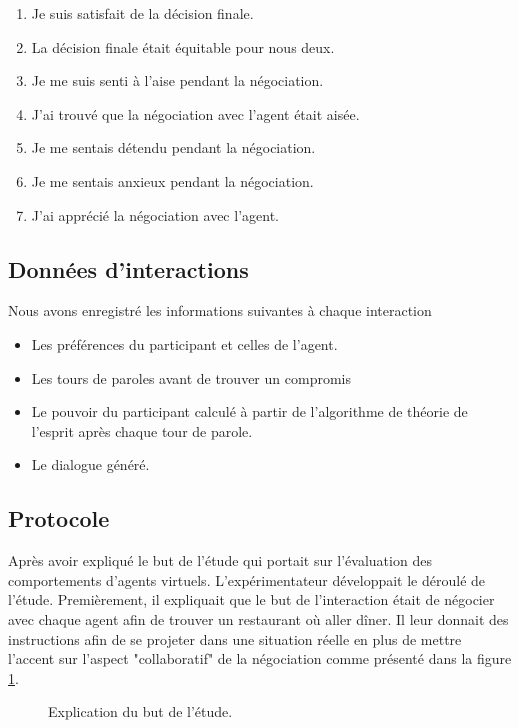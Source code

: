 		 \begin{enumerate}
		 	\item Je suis satisfait de la décision finale.
		 	\item La décision finale était équitable pour nous deux.
			\item Je me suis senti à l'aise pendant la négociation.
			\item J'ai trouvé que la négociation avec l'agent était aisée.
			\item Je me sentais détendu pendant la négociation.
			\item Je me sentais anxieux pendant la négociation.
			\item J'ai apprécié la négociation avec l'agent.
		 \end{enumerate}
		 
		  \subsection{Données d'interactions}
		  Nous avons enregistré les informations suivantes à chaque interaction
		  \begin{itemize}
		  	\item Les préférences du participant et celles de l'agent.
		  	\item Les tours de paroles avant de trouver un compromis
		  	\item Le pouvoir du participant calculé à partir de l'algorithme de théorie de l'esprit après chaque tour de parole.
		  	\item Le dialogue généré.
		  	
		  \end{itemize}


	\subsection{Protocole}
		Après avoir expliqué le but de l'étude qui portait sur l'évaluation des comportements d'agents virtuels. L'expérimentateur développait le déroulé de l'étude. 
		Premièrement, il expliquait que le but de l'interaction était de négocier avec chaque agent afin de trouver un restaurant où aller dîner. Il leur donnait des instructions afin de se projeter dans une situation réelle en plus de mettre l'accent sur l'aspect "collaboratif" de la négociation comme présenté dans la figure \ref{fig:instruction}.
		
		\begin{figure}[h]
				
				\caption{\label{fig:instruction}Explication du but de l'étude.}
			\end{figure}


